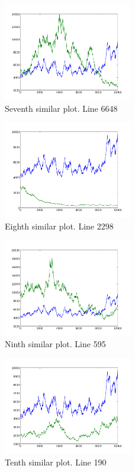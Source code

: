 \begin{figure}[h!]
    \centering
    \includegraphics[width=0.5\textwidth]{images/6648.png}
    \caption{Seventh similar plot.  Line 6648}
    \label{fig:ex1_7}
\end{figure}

\begin{figure}[h!]
    \centering
    \includegraphics[width=0.5\textwidth]{images/2298.png}
    \caption{Eighth similar plot.  Line 2298}
    \label{fig:ex1_8}
\end{figure}

\begin{figure}[h!]
    \centering
    \includegraphics[width=0.5\textwidth]{images/595.png}
    \caption{Ninth similar plot.  Line 595}
    \label{fig:ex1_9}
\end{figure}

\begin{figure}[h!]
    \centering
    \includegraphics[width=0.5\textwidth]{images/190.png}
    \caption{Tenth similar plot.  Line 190}
    \label{fig:ex1_10}
\end{figure}
